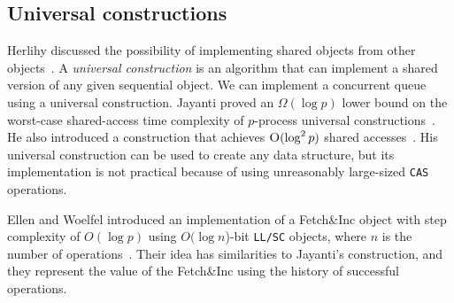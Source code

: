 \documentclass[12pt]{article}
\begin{document}
\subsection{Universal constructions}
Herlihy discussed the possibility of implementing shared objects from other objects~\cite{10.1145/114005.102808}. A \textit{universal construction} is an algorithm that can implement a shared version of any given sequential object. We can implement a concurrent queue using a universal construction. Jayanti proved an $\Omega(\log p)$ lower bound on the worst-case shared-access time complexity of $p$-process universal constructions~\cite{DBLP:conf/podc/Jayanti98a}. He also introduced a construction that achieves $\textsc{O}(\log^2 p)$ shared accesses~\cite{DBLP:conf/podc/ChandraJT98}. His universal construction can be used to create any data structure, but its implementation is not practical because of using unreasonably large-sized \texttt{CAS} operations.

Ellen and Woelfel introduced an implementation of a Fetch\&Inc object with step complexity of $O(\log p)$ using $O(\log n$)-bit \texttt{LL/SC} objects, where $n$ is the number of operations~\cite{10.1007/978-3-642-41527-2_20}. Their idea has similarities to Jayanti's construction, and they represent the value of the Fetch\&Inc using the history of successful operations. 



\end{document}
